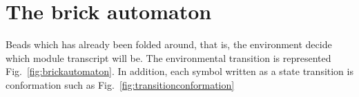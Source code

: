 \documentclass[runningheads]{llncs}
\begin{document}
\section{The brick automaton}
Beads which has already been folded around, that is, the environment decide which module transcript will be.
The environmental transition is represented Fig.~\ref{fig:brickautomaton}.
In addition, each symbol written as a state transition is conformation such as Fig.~\ref{fig:transitionconformation}
%
%
%
\end{document}
